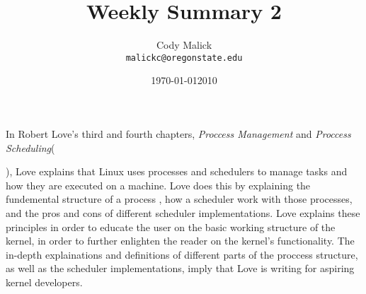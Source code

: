 \documentclass[10pt,letterpaper]{article}
\begin{document}
  \title{Weekly Summary 2}
  \author{Cody Malick\\
  \texttt{malickc@oregonstate.edu}}
  \date{\today}
  \maketitle

    In Robert Love's third and fourth chapters, \textit{Proccess Management}
    and \textit{Proccess Scheduling}(\date{2010}), Love explains that Linux uses
    processes and schedulers to manage tasks and how they are executed on a
    machine. Love does this by explaining the fundemental structure of a process
    , how a scheduler work with those processes, and the pros and cons of
    different scheduler implementations. Love explains these principles in order
    to educate the user on the basic working structure of the kernel, in order
    to further enlighten the reader on the kernel's functionality. The in-depth
    explainations and definitions of different parts of the proccess structure,
    as well as the scheduler implementations, imply that Love is writing for
    aspiring kernel developers.
\end{document}
